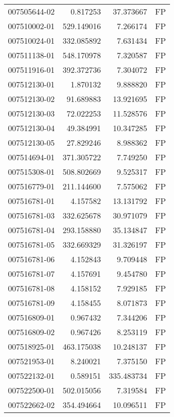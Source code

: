 \begin{tabular}{lrrl}
007505644-02 &    0.817253 &      37.373667 &   FP \\
007510002-01 &  529.149016 &       7.266174 &   FP \\
007510024-01 &  332.085892 &       7.631434 &   FP \\
007511138-01 &  548.170978 &       7.320587 &   FP \\
007511916-01 &  392.372736 &       7.304072 &   FP \\
007512130-01 &    1.870132 &       9.888820 &   FP \\
007512130-02 &   91.689883 &      13.921695 &   FP \\
007512130-03 &   72.022253 &      11.528576 &   FP \\
007512130-04 &   49.384991 &      10.347285 &   FP \\
007512130-05 &   27.829246 &       8.988362 &   FP \\
007514694-01 &  371.305722 &       7.749250 &   FP \\
007515308-01 &  508.802669 &       9.525317 &   FP \\
007516779-01 &  211.144600 &       7.575062 &   FP \\
007516781-01 &    4.157582 &      13.131792 &   FP \\
007516781-03 &  332.625678 &      30.971079 &   FP \\
007516781-04 &  293.158880 &      35.134847 &   FP \\
007516781-05 &  332.669329 &      31.326197 &   FP \\
007516781-06 &    4.152843 &       9.709448 &   FP \\
007516781-07 &    4.157691 &       9.454780 &   FP \\
007516781-08 &    4.158152 &       7.929185 &   FP \\
007516781-09 &    4.158455 &       8.071873 &   FP \\
007516809-01 &    0.967432 &       7.344206 &   FP \\
007516809-02 &    0.967426 &       8.253119 &   FP \\
007518925-01 &  463.175038 &      10.248137 &   FP \\
007521953-01 &    8.240021 &       7.375150 &   FP \\
007522132-01 &    0.589151 &     335.483734 &   FP \\
007522500-01 &  502.015056 &       7.319584 &   FP \\
007522662-02 &  354.494664 &      10.096511 &   FP \\

\end{tabular}
